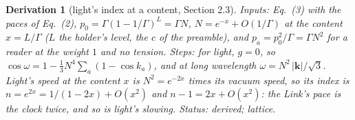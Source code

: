 \documentclass[pdflatex,sn-mathphys-num]{sn-jnl}
\theoremstyle{thmstyleone}
\newtheorem{derivation}{Derivation}
\begin{document}
\begin{derivation}[light's index at a content, Section 2.3]
\emph{Inputs:} Eq.~(3) with the paces of Eq.~(2), $p_0 = \Gamma(1 - 1 / \Gamma)^L = \Gamma N$, $N = e^{-x} + O(1 / \Gamma)$ at the content $x = L / \Gamma$ ($L$ the holder's level, the $c$ of the preamble), and $p_a = p_0^2 / \Gamma = \Gamma N^2$ for a reader at the weight $1$ and no tension. \emph{Steps:} for light, $g = 0$, so $\cos\omega = 1 - \frac{1}{3}N^4\sum_a(1 - \cos k_a)$, and at long wavelength $\omega = N^2\,|\mathbf k| / \sqrt 3$. Light's speed at the content $x$ is $N^2 = e^{-2x}$ times its vacuum speed, so its index is $n = e^{2x} = 1 / (1 - 2x) + O(x^2)$ and $n - 1 = 2x + O(x^2)$: the Link's pace is the clock twice, and so is light's slowing.
 \emph{Status:} derived; lattice.
\end{derivation}
\end{document}
